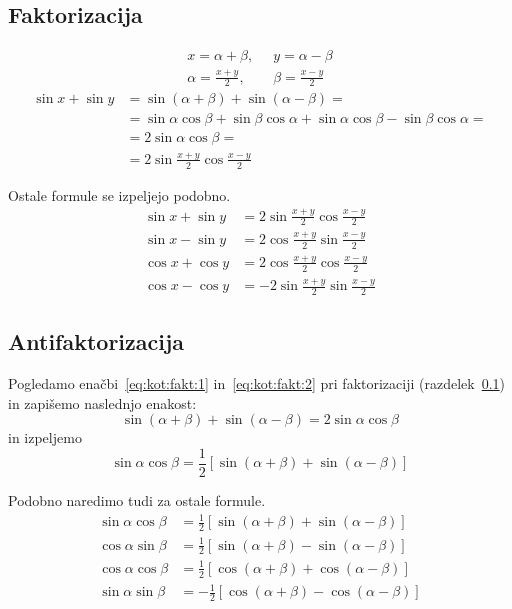 \documentclass[a4paper,oneside,12pt,fleqn]{article}
\def\kos{\cos}
\numberwithin{equation}{section}
\begin{document}
\subsection{Faktorizacija}
\label{sec:kot:fakt}
\begin{align*}
  x=\alpha+\beta,& \;\; y=\alpha-\beta \\
  \alpha = \frac{x+y}{2},& \;\; \beta=\frac{x-y}{2}
\end{align*}
\begin{align}
  \sin{x}+\sin{y} & = \sin(\alpha+\beta) + \sin(\alpha-\beta) = \label{eq:kot:fakt:1} \\
  &=\sin\alpha\kos\beta+\sin\beta\kos\alpha+\sin\alpha\kos\beta-\sin\beta\kos\alpha = \nonumber \\
  &=2\sin\alpha\kos\beta = \label{eq:kot:fakt:2} \\ &= 2\sin\frac{x+y}{2}\kos\frac{x-y}{2} \nonumber
\end{align}

Ostale formule se izpeljejo podobno.
\begin{align*}
  \sin{x} + \sin{y} &= 2\sin\frac{x+y}{2}\cos\frac{x-y}{2} \\
  \sin{x} - \sin{y} &= 2\cos\frac{x+y}{2}\sin\frac{x-y}{2} \\
  \cos{x} + \cos{y} &= 2\cos\frac{x+y}{2}\cos\frac{x-y}{2} \\
  \cos{x} - \cos{y} &=-2\sin\frac{x+y}{2}\sin\frac{x-y}{2}
\end{align*}

\subsection{Antifaktorizacija}
\label{sec:kot:antif}
Pogledamo enačbi~\eqref{eq:kot:fakt:1} in~\eqref{eq:kot:fakt:2} pri faktorizaciji
(razdelek~\ref{sec:kot:fakt}) in zapišemo naslednjo enakost:
\[ \sin(\alpha+\beta) + \sin(\alpha-\beta) = 2\sin\alpha\kos\beta \]
in izpeljemo
\[ \sin\alpha\kos\beta = \frac{1}{2}\left[ \sin(\alpha+\beta) + \sin(\alpha-\beta) \right]
\]

Podobno naredimo tudi za ostale formule.
\begin{align*}
  \sin\alpha\cos\beta &= \frac{1}{2}\left[ \sin(\alpha+\beta)+\sin(\alpha-\beta) \right] \\
  \cos\alpha\sin\beta &= \frac{1}{2}\left[ \sin(\alpha+\beta)-\sin(\alpha-\beta) \right] \\
  \cos\alpha\cos\beta &= \frac{1}{2}\left[ \cos(\alpha+\beta)+\cos(\alpha-\beta) \right] \\
  \sin\alpha\sin\beta &= -\frac{1}{2}\left[ \cos(\alpha+\beta)-\cos(\alpha-\beta)  \right] \\
\end{align*}
\end{document}
